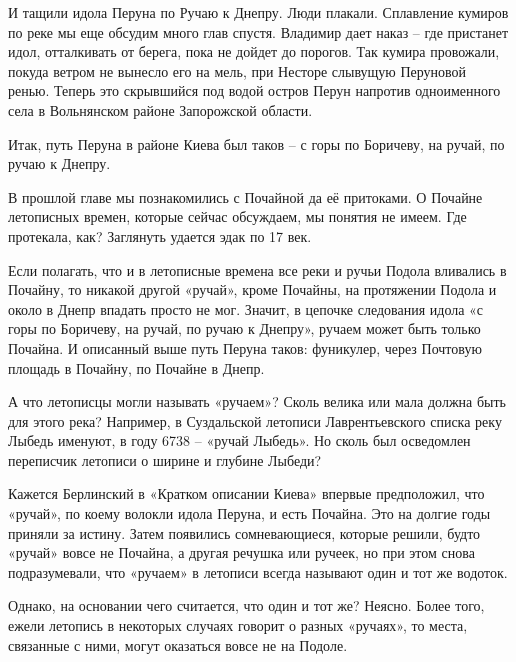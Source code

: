 И тащили идола Перуна по Ручаю к Днепру. Люди плакали. Сплавление кумиров по реке мы еще обсудим много глав спустя. Владимир дает наказ – где пристанет идол, отталкивать от берега, пока не дойдет до порогов. Так кумира провожали, покуда ветром не вынесло его на мель, при Несторе слывущую Перуновой ренью. Теперь это скрывшийся под водой остров Перун напротив одноименного села в Вольнянском районе Запорожской области.
 
Итак, путь Перуна в районе Киева был таков – с горы по Боричеву, на ручай, по ручаю к Днепру.

В прошлой главе мы познакомились с Почайной да её притоками. О Почайне летописных времен, которые сейчас обсуждаем, мы понятия не имеем. Где протекала, как? Заглянуть удается эдак по 17 век.

Если полагать, что и в летописные времена все реки и ручьи Подола вливались в Почайну, то никакой другой «ручай», кроме Почайны, на протяжении Подола и около в Днепр впадать просто не мог. Значит, в цепочке следования идола «с горы по Боричеву, на ручай, по ручаю к Днепру», ручаем может быть только Почайна. И описанный выше путь Перуна таков: фуникулер, через Почтовую площадь в Почайну, по Почайне в Днепр.


А что летописцы могли называть «ручаем»? Сколь велика или мала должна быть для этого река? Например, в Суздальской летописи Лаврентьевского списка реку Лыбедь именуют, в году 6738 – «ручай Лыбедь». Но сколь был осведомлен переписчик летописи о ширине и глубине Лыбеди?

Кажется Берлинский в «Кратком описании Киева» впервые предположил, что «ручай», по коему волокли идола Перуна, и есть Почайна. Это на долгие годы приняли за истину. Затем появились сомневающиеся, которые решили, будто «ручай» вовсе не Почайна, а другая речушка или ручеек, но при этом снова подразумевали, что «ручаем» в летописи всегда называют один и тот же водоток.

Однако, на основании чего считается, что один и тот же? Неясно. Более того, ежели летопись в некоторых случаях говорит о разных «ручаях», то места, связанные с ними, могут оказаться вовсе не на Подоле.

